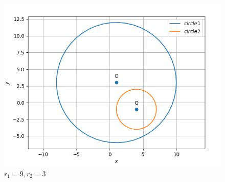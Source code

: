 \documentclass[10pt, a4paper]{article}
\begin{document}
\begin{figure}[h!]
  \includegraphics[scale=0.5]{fig3.png}
  \caption{$r_{1}=9,r_{2}=3$}
  \label{fig:circle assignment}
\end{figure}
\end{document}
